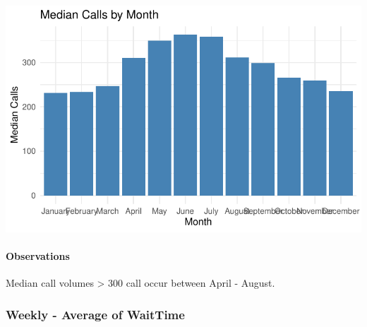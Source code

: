 \documentclass[
  letterpaper,
  DIV=11,
  numbers=noendperiod]{scrartcl}
\let\oldparagraph\paragraph
\renewcommand{\paragraph}[1]{\oldparagraph{#1}\mbox{}}
\begin{document}
\includegraphics{final_proj_group1_files/figure-pdf/aggregate_monthly-1.pdf}

\paragraph{Observations}\label{observations-8}

Median call volumes \textgreater{} 300 call occur between April -
August.

\subsubsection{Weekly - Average of
WaitTime}\label{weekly---average-of-waittime}
\end{document}
